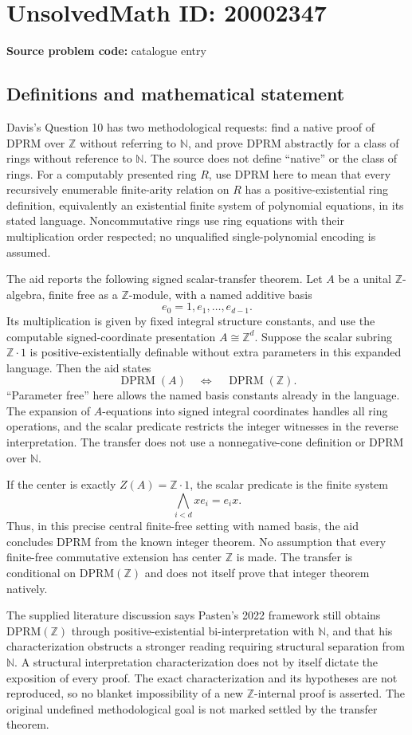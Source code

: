 \documentclass[11pt]{article}
\newcommand{\N}{\mathbb{N}}
\newcommand{\Z}{\mathbb{Z}}
\begin{document}
\section*{UnsolvedMath ID: 20002347}
\textbf{Source problem code:} catalogue entry
\subsection{Definitions and mathematical statement}
Davis's Question 10 has two methodological requests: find a native proof of DPRM over \(\Z\) without referring to \(\N\), and prove DPRM abstractly for a class of rings without reference to \(\N\). The source does not define ``native'' or the class of rings. For a computably presented ring \(R\), use DPRM here to mean that every recursively enumerable finite-arity relation on \(R\) has a positive-existential ring definition, equivalently an existential finite system of polynomial equations, in its stated language. Noncommutative rings use ring equations with their multiplication order respected; no unqualified single-polynomial encoding is assumed.

The aid reports the following signed scalar-transfer theorem. Let \(A\) be a unital \(\Z\)-algebra, finite free as a \(\Z\)-module, with a named additive basis
\[
 e_0=1,e_1,\ldots,e_{d-1}.
\]
Its multiplication is given by fixed integral structure constants, and use the computable signed-coordinate presentation \(A\cong\Z^d\). Suppose the scalar subring \(\Z\cdot1\) is positive-existentially definable without extra parameters in this expanded language. Then the aid states
\[
 \operatorname{DPRM}(A)\quad\Longleftrightarrow\quad
 \operatorname{DPRM}(\Z).
\]
``Parameter free'' here allows the named basis constants already in the language. The expansion of \(A\)-equations into signed integral coordinates handles all ring operations, and the scalar predicate restricts the integer witnesses in the reverse interpretation. The transfer does not use a nonnegative-cone definition or DPRM over \(\N\).

If the center is exactly \(Z(A)=\Z\cdot1\), the scalar predicate is the finite system
\[
 \bigwedge_{i<d}xe_i=e_ix.
\]
Thus, in this precise central finite-free setting with named basis, the aid concludes DPRM from the known integer theorem. No assumption that every finite-free commutative extension has center \(\Z\) is made. The transfer is conditional on DPRM\((\Z)\) and does not itself prove that integer theorem natively.

The supplied literature discussion says Pasten's 2022 framework still obtains DPRM\((\Z)\) through positive-existential bi-interpretation with \(\N\), and that his characterization obstructs a stronger reading requiring structural separation from \(\N\). A structural interpretation characterization does not by itself dictate the exposition of every proof. The exact characterization and its hypotheses are not reproduced, so no blanket impossibility of a new \(\Z\)-internal proof is asserted. The original undefined methodological goal is not marked settled by the transfer theorem.
\end{document}
